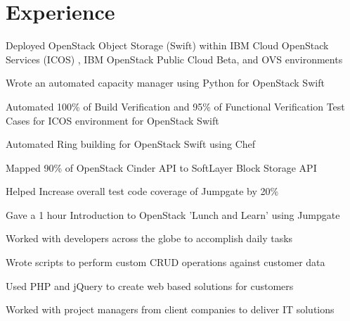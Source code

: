 \documentclass[letterpaper]{resume} %
\begin{document}
\begin{minipage}[t]{0.66\textwidth} %


\section{Experience}

\vspace{\topsep} %
\begin{tightitemize}
\item Deployed OpenStack Object Storage (Swift) within IBM Cloud OpenStack Services (ICOS) , IBM OpenStack Public Cloud Beta, and OVS environments
\item Wrote an automated capacity manager using Python for OpenStack Swift
\item Automated 100\% of Build Verification and 95\% of Functional Verification Test Cases for ICOS environment for OpenStack Swift
\item Automated Ring building for OpenStack Swift using Chef
\item Mapped 90\% of OpenStack Cinder API to SoftLayer Block Storage API
\item Helped Increase overall test code coverage of Jumpgate by 20\%
\item Gave a 1 hour Introduction to OpenStack ’Lunch and Learn’ using Jumpgate
\item Worked with developers across the globe to accomplish daily tasks
\end{tightitemize}

\sectionspace %



\begin{tightitemize}
\item Wrote scripts to perform custom CRUD operations against customer data
\item Used PHP and jQuery to create web based solutions for customers
\item Worked with project managers from client companies to deliver IT solutions
\end{tightitemize}


\end{minipage}
\end{document}
